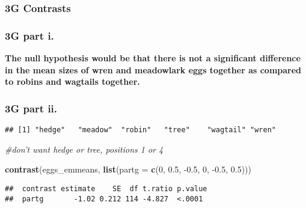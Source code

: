 \documentclass[]{article}
\newenvironment{Shaded}{\begin{snugshade}}{\end{snugshade}}
\newcommand{\CommentTok}[1]{\textcolor[rgb]{0.56,0.35,0.01}{\textit{#1}}}
\newcommand{\DataTypeTok}[1]{\textcolor[rgb]{0.13,0.29,0.53}{#1}}
\newcommand{\DecValTok}[1]{\textcolor[rgb]{0.00,0.00,0.81}{#1}}
\newcommand{\FloatTok}[1]{\textcolor[rgb]{0.00,0.00,0.81}{#1}}
\newcommand{\KeywordTok}[1]{\textcolor[rgb]{0.13,0.29,0.53}{\textbf{#1}}}
\newcommand{\NormalTok}[1]{#1}
\newcommand{\OperatorTok}[1]{\textcolor[rgb]{0.81,0.36,0.00}{\textbf{#1}}}
\newcommand{\StringTok}[1]{\textcolor[rgb]{0.31,0.60,0.02}{#1}}
\begin{document}
\hypertarget{g-contrasts}{%
\subsubsection{3G Contrasts}\label{g-contrasts}}

\hypertarget{g-part-i.}{%
\subsubsection{3G part i.}\label{g-part-i.}}

\textbf{The null hypothesis would be that there is not a significant
difference in the mean sizes of wren and meadowlark eggs together as
compared to robins and wagtails together.}

\hypertarget{g-part-ii.}{%
\subsubsection{3G part ii.}\label{g-part-ii.}}

\begin{Shaded}
\end{Shaded}

\begin{verbatim}
## [1] "hedge"   "meadow"  "robin"   "tree"    "wagtail" "wren"
\end{verbatim}

\begin{Shaded}
\begin{Highlighting}[]
\CommentTok{#don't want hedge or tree, positions 1 or 4}

\KeywordTok{contrast}\NormalTok{(eggs_emmeans, }\KeywordTok{list}\NormalTok{(}\DataTypeTok{partg =} \KeywordTok{c}\NormalTok{(}\DecValTok{0}\NormalTok{, }\FloatTok{0.5}\NormalTok{, }\FloatTok{-0.5}\NormalTok{, }\DecValTok{0}\NormalTok{, }\FloatTok{-0.5}\NormalTok{, }\FloatTok{0.5}\NormalTok{)))}
\end{Highlighting}
\end{Shaded}

\begin{verbatim}
##  contrast estimate    SE  df t.ratio p.value
##  partg       -1.02 0.212 114 -4.827  <.0001
\end{verbatim}
\end{document}
